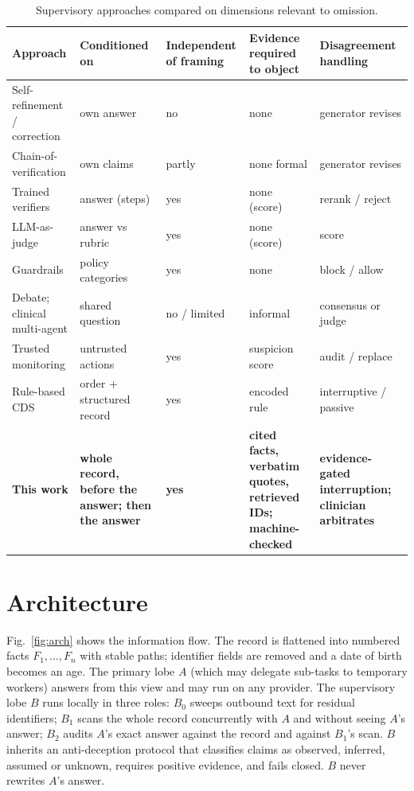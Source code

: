\documentclass[journal]{IEEEtran}
\begin{document}
\begin{table}[!t]
\caption{Supervisory approaches compared on dimensions relevant to omission.}
\label{tab:related}
\centering
\footnotesize
\begin{tabular}{@{}p{3.6cm}p{3.1cm}p{2.3cm}p{3.4cm}p{3.3cm}@{}}
\toprule
Approach & Conditioned on & Independent of framing & Evidence required to object & Disagreement handling\\
\midrule
Self-refinement / correction \cite{madaan2023,shinn2023,huang2024} & own answer & no & none & generator revises\\
Chain-of-verification \cite{dhuliawala2024} & own claims & partly & none formal & generator revises\\
Trained verifiers \cite{cobbe2021,lightman2024} & answer (steps) & yes & none (score) & rerank / reject\\
LLM-as-judge \cite{zheng2023} & answer vs rubric & yes & none (score) & score\\
Guardrails \cite{inan2023,rebedea2023} & policy categories & yes & none & block / allow\\
Debate; clinical multi-agent \cite{du2024,irving2018,tang2024,kim2024} & shared question & no / limited & informal & consensus or judge\\
Trusted monitoring \cite{greenblatt2024} & untrusted actions & yes & suspicion score & audit / replace\\
Rule-based CDS \cite{bates2003,vandersijs2006,sutton2020} & order + structured record & yes & encoded rule & interruptive / passive\\
\textbf{This work} & \textbf{whole record, before the answer; then the answer} & \textbf{yes} & \textbf{cited facts, verbatim quotes, retrieved IDs; machine-checked} & \textbf{evidence-gated interruption; clinician arbitrates}\\
\bottomrule
\end{tabular}
\end{table}

\section{Architecture}
Fig.~\ref{fig:arch} shows the information flow. The record is flattened into numbered facts $F_1,\dots,F_n$ with stable paths; identifier fields are removed and a date of birth becomes an age. The primary lobe $A$ (which may delegate sub-tasks to temporary workers) answers from this view and may run on any provider. The supervisory lobe $B$ runs locally in three roles: $B_0$ sweeps outbound text for residual identifiers; $B_1$ scans the whole record concurrently with $A$ and without seeing $A$'s answer; $B_2$ audits $A$'s exact answer against the record and against $B_1$'s scan. $B$ inherits an anti-deception protocol that classifies claims as observed, inferred, assumed or unknown, requires positive evidence, and fails closed. $B$ never rewrites $A$'s answer.
\end{document}
